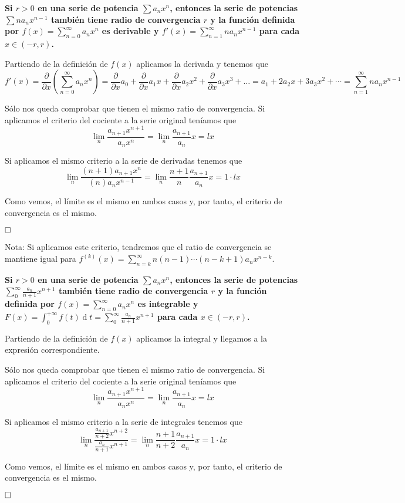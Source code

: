 \documentclass[a4paper]{article}
\renewcommand{\d}[1]{\ensuremath{\operatorname{d}\!{#1}}}
\newcommand{\parfrac}[1]{\frac{\partial}{\partial {#1}}}
\newcommand{\qed}{\begin{flushright}
		{$\newline\square$}
	\end{flushright}}
\begin{document}
\textbf{Si $r > 0$ en una serie de potencia $\sum a_n x^n$, entonces la serie de potencias $\sum na_nx^{n-1}$ también tiene radio de convergencia $r$ y la función definida por $f(x) = \sum_{n=0}^{\infty}a_nx^n$ es derivable y $f'(x) = \sum_{n=1}^\infty na_nx^{n-1}$ para cada $x\in(-r,r)$.}

Partiendo de la definición de $f(x)$ aplicamos la derivada y tenemos que
$$f'(x) = \parfrac{x}\left(\sum_{n=0}^{\infty}a_nx^n\right) = \parfrac{x}a_0 + \parfrac{x}a_1x + \parfrac{x}a_2x^2 + \parfrac{x}a_3x^3 + \dots = a_1 + 2a_2x + 3a_3x^2 + \cdots = \sum_{n=1}^\infty na_nx^{n-1} $$

Sólo nos queda comprobar que tienen el mismo ratio de convergencia.
Si aplicamos el criterio del cociente a la serie original teníamos que 
$$\lim_n  \frac{ a_{n+1} x^{n+1}}{ a_n x^n}= \lim_n \frac{a_{n+1}}{a_n} x = lx$$

Si aplicamos el mismo criterio a la serie de derivadas tenemos que 
$$\lim_n  \frac{ (n+1)a_{n+1} x^{n}}{ (n)a_n x^{n-1}}= \lim_n \frac{{n+1}}{n}\frac{a_{n+1}}{a_n} x = 1\cdot lx$$

Como vemos, el límite es el mismo en ambos casos y, por tanto, el criterio de convergencia es el mismo.\qed

Nota: Si aplicamos este criterio, tendremos que el ratio de convergencia se mantiene igual para $f^{(k)}(x) = \sum_{n=k}^\infty n(n-1)\cdots(n-k+1)a_nx^{n-k}$.

\textbf{Si $r > 0$ en una serie de potencia $\sum a_n x^n$, entonces la serie de potencias $\sum_0^\infty \frac{a_n}{n+1}x^{n+1}$ también tiene radio de convergencia $r$ y la función definida por $f(x) = \sum_{n=0}^{\infty}a_nx^n$ es integrable  y $F(x) = \int_0^{+\infty} f(t) \d t = \sum_0^\infty \frac{a_n}{n+1}x^{n+1}$ para cada $x\in(-r,r)$.}

Partiendo de la definición de $f(x)$ aplicamos la integral y llegamos a la expresión correspondiente.

Sólo nos queda comprobar que tienen el mismo ratio de convergencia.
Si aplicamos el criterio del cociente a la serie original teníamos que 
$$\lim_n  \frac{ a_{n+1} x^{n+1}}{ a_n x^n}= \lim_n \frac{a_{n+1}}{a_n} x = lx$$

Si aplicamos el mismo criterio a la serie de integrales tenemos que 
$$\lim_n  \frac{ \frac{a_{n+1}}{n+2}x^{n+2}}{\frac{a_n}{n+1}x^{n+1}}= \lim_n \frac{{n+1}}{n+2}\frac{a_{n+1}}{a_n} x = 1\cdot lx$$

Como vemos, el límite es el mismo en ambos casos y, por tanto, el criterio de convergencia es el mismo.\qed
\end{document}
